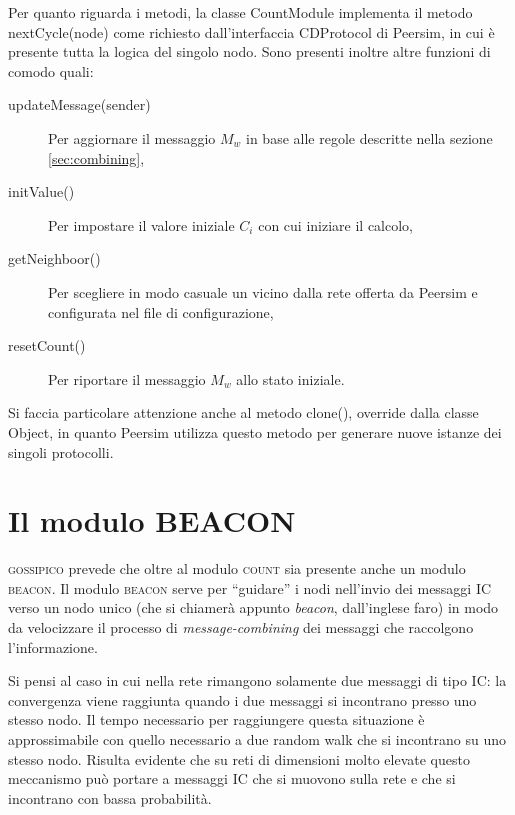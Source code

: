 \documentclass[a4paper,12pt]{article}
\begin{document}
Per quanto riguarda i metodi, la classe \textsf{CountModule} implementa il metodo \textsf{nextCycle(node)} come richiesto dall'interfaccia \textsf{CDProtocol} di Peersim, in cui \`e presente tutta la logica del singolo nodo. Sono presenti inoltre altre funzioni di comodo quali:
\begin{description}
\item[\textsf{updateMessage(sender)}] Per aggiornare il messaggio $M_w$ in base alle regole descritte nella sezione \ref{sec:combining},
\item[\textsf{initValue()}] Per impostare il valore iniziale $C_i$ con cui iniziare il calcolo,
\item[\textsf{getNeighboor()}] Per scegliere in modo casuale un vicino dalla rete offerta da Peersim e configurata nel file di configurazione,
\item[\textsf{resetCount()}] Per riportare il messaggio $M_w$ allo stato iniziale.
\end{description}

Si faccia particolare attenzione anche al metodo \textsf{clone()}, override dalla classe \textsf{Object}, in quanto Peersim utilizza questo metodo per generare nuove istanze dei singoli protocolli.

\section{Il modulo BEACON}
\label{sec:beacon}

\textsc{gossipico} prevede che oltre al modulo \textsc{count} sia presente anche un modulo \textsc{beacon}. Il modulo \textsc{beacon} serve per ``guidare'' i nodi nell'invio dei messaggi IC verso un nodo unico (che si chiamer\`a appunto \emph{beacon}, dall'inglese faro) in modo da velocizzare il processo di \emph{message-combining} dei messaggi che raccolgono l'informazione.

Si pensi al caso in cui nella rete rimangono solamente due messaggi di tipo IC: la convergenza viene raggiunta quando i due messaggi si incontrano presso uno stesso nodo. Il tempo necessario per raggiungere questa situazione \`e approssimabile con quello necessario a due random walk che si incontrano su uno stesso nodo. Risulta evidente che su reti di dimensioni molto elevate questo meccanismo pu\`o portare a messaggi IC che si muovono sulla rete e che si incontrano con bassa probabilit\`a.
\end{document}
